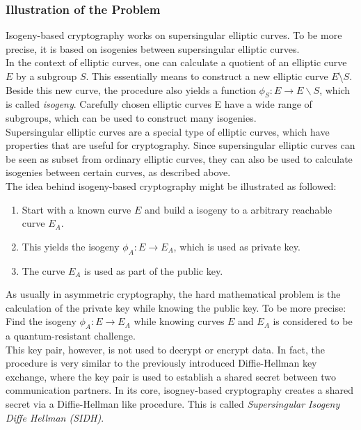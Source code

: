 \subsubsection{Illustration of the Problem ~\parencite{urbanik2017friendly}~\parencite{costello2019supersingular}}
Isogeny-based cryptography works on supersingular elliptic curves. To be more precise, it is based on isogenies between supersingular elliptic curves.
\\
In the context of elliptic curves, one can calculate a quotient of an elliptic curve $E$ by a subgroup $S$. This essentially means to construct a new elliptic curve $E$\textbackslash $S$.
Beside this new curve, the procedure also yields a function $\phi_S: E \to E \backslash S$, which is called \textit{isogeny}. Carefully chosen elliptic curves E have a wide range of subgroups, which can be used to construct many isogenies.
\\
Supersingular elliptic curves are a special type of elliptic curves, which have properties that are useful for cryptography. Since supersingular elliptic curves can be seen as subset from ordinary elliptic curves, they can also be used to calculate isogenies between certain curves, as described above.
\\
The idea behind isogeny-based cryptography might be illustrated as followed:

\begin{enumerate}
\item Start with a known curve $E$ and build a isogeny to a arbitrary reachable curve $E_A$.
\item This yields the isogeny $\phi_A: E \to E_A$, which is used as private key.
\item The curve $E_A$ is used as part of the public key.
\end{enumerate}
As usually in asymmetric cryptography, the hard mathematical problem is the calculation of the private key while knowing the public key. To be more precise: Find the isogeny $\phi_A: E \to E_A$ while knowing curves $E$ and $E_A$ is considered to be a quantum-resistant challenge.
\\
This key pair, however, is not used to decrypt or encrypt data. In fact, the procedure is very similar to the previously introduced Diffie-Hellman key exchange, where the key pair is used to establish a shared secret between two communication partners.
In its core, isogney-based cryptography creates a shared secret via a Diffie-Hellman like procedure. This is called \textit{Supersingular Isogeny Diffe Hellman (SIDH)}.

